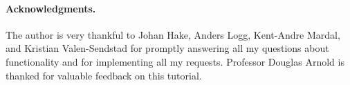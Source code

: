 \paragraph{Acknowledgments.}
The author is very thankful to Johan Hake, Anders Logg,
Kent-Andre Mardal, and Kristian Valen-Sendstad
for promptly answering all my questions about
\fenics{} functionality and for implementing all my requests.
Professor Douglas Arnold is thanked for valuable feedback on
this tutorial.
